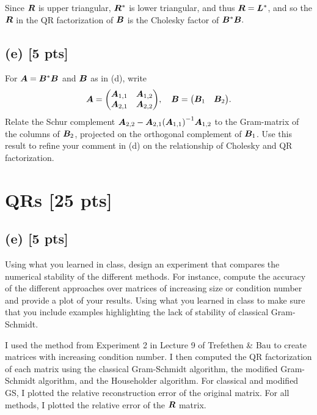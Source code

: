\documentclass[twoside,10pt]{article}
\begin{document}
Since $\bm{R}$ is upper triangular, $\bm{R}^{*}$ is lower triangular, and thus $\bm{R}=\bm{L}^{*}$, and so the $\bm{R}$ in the QR factorization of $\bm{B}$ is the Cholesky factor of $\bm{B}^{*}\bm{B}.$

\subsection*{(e) [5 pts]} 
For $\bm{A} = \bm{B}^* \bm{B}$ and $\bm{B}$ as in (d), write 
\begin{equation}
\mtx{A} = 
\begin{pmatrix}
 \mtx{A}_{1,1}& \mtx{A}_{1,2} \\
 \mtx{A}_{2,1}& \mtx{A}_{2,2} 
\end{pmatrix}, 
\quad 
\mtx{B} = 
\begin{pmatrix}
 \mtx{B}_{1} &  \mtx{B}_{2} 
\end{pmatrix}. 
\end{equation}
Relate the Schur complement $\mtx{A}_{2,2} - \mtx{A}_{2,1} \left(\mtx{A}_{1, 1}\right)^{-1} \mtx{A}_{1,2}$ to the Gram-matrix of the columns of $\bm{B}_2$, projected on the orthogonal complement of $\bm{B}_1$.
Use this result to refine your comment in (d) on the relationship of Cholesky and QR factorization. 

\section{QRs [25 pts]}
\subsection*{(e) [5 pts]}
Using what you learned in class, design an experiment that compares the numerical stability of the different methods. 
For instance, compute the accuracy of the different approaches over matrices of increasing size or condition number and provide a plot of your results.
Using what you learned in class to make sure that you include examples highlighting the lack of stability of classical Gram-Schmidt.

\quad I used the method from Experiment 2 in Lecture 9 of Trefethen \& Bau to create matrices with increasing condition number.
I then computed the QR factorization of each matrix using the classical Gram-Schmidt algorithm, the modified Gram-Schmidt algorithm, and the Householder algorithm.
For classical and modified GS, I plotted the relative reconstruction error of the original matrix.
For all methods, I plotted the relative error of the $\bm{R}$ matrix.
\end{document}
